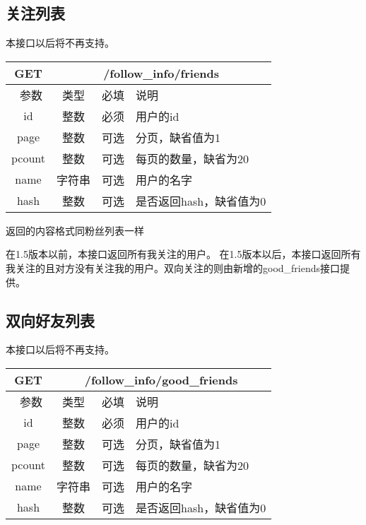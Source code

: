 \subsection{关注列表}
本接口以后将不再支持。
\begin{table}[H]
   \begin{center}
\begin{tabular}{|c|c|c|p{12cm}|}
\hline
GET & \multicolumn{3}{|c|}{/follow\_info/friends} \\
\hline\hline
 \  参数  & 类型 & 必填 &  说明  \\
\hline
 id  & 整数 & 必须 &  用户的id\\
   \hline
 page  & 整数 & 可选 & 分页，缺省值为1\\ 
 \hline
 pcount  & 整数 & 可选 & 每页的数量，缺省为20\\ 
     \hline
 name  & 字符串 & 可选 & 用户的名字\\ 
     \hline
 hash  & 整数 & 可选 & 是否返回hash，缺省值为0\\ 
\hline

\end{tabular}
   \end{center}
\end{table}

返回的内容格式同粉丝列表一样

在1.5版本以前，本接口返回所有我关注的用户。
在1.5版本以后，本接口返回所有我关注的且对方没有关注我的用户。双向关注的则由新增的good\_friends接口提供。


\subsection{双向好友列表}
本接口以后将不再支持。
\begin{table}[H]
   \begin{center}
\begin{tabular}{|c|c|c|p{12cm}|}
\hline
GET & \multicolumn{3}{|c|}{/follow\_info/good\_friends} \\
\hline\hline
 \  参数  & 类型 & 必填 &  说明  \\
\hline
 id  & 整数 & 必须 &  用户的id\\
   \hline
 page  & 整数 & 可选 & 分页，缺省值为1\\ 
 \hline
 pcount  & 整数 & 可选 & 每页的数量，缺省为20\\ 
     \hline
 name  & 字符串 & 可选 & 用户的名字\\ 
     \hline
 hash  & 整数 & 可选 & 是否返回hash，缺省值为0\\ 
\hline

\end{tabular}
   \end{center}
\end{table}


